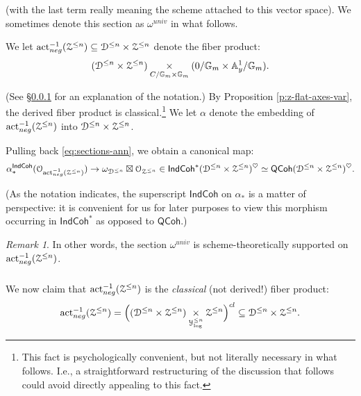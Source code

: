 \documentclass[reqno,11pt]{amsart}
\numberwithin{equation}{subsection}
\theoremstyle{remark}
\newtheorem{rem}[thm]{Remark}
\newcommand{\bA}{{\mathbb A}}
\newcommand{\bG}{{\mathbb G}}
\newcommand{\sD}{{\EuScript D}}
\newcommand{\sO}{{\EuScript O}}
\newcommand{\sY}{{\EuScript Y}}
\newcommand{\sZ}{{\EuScript Z}}
\newcommand{\on}{\operatorname}
\newcommand{\act}{\on{act}}
\newcommand{\heart}{\heartsuit}
\newcommand{\IndCoh}{\mathsf{IndCoh}}
\newcommand{\QCoh}{\mathsf{QCoh}}
\renewcommand{\subset}{\subseteq}
\begin{document}
\noindent (with the last term really meaning the
scheme attached to this vector space). We sometimes
denote this section as $\omega^{univ}$ in what
follows.

We let 
$\act_{neg}^{-1}(\sZ^{\leq n}) \subset 
\sD^{\leq n} \times \sZ^{\leq n}$ denote the fiber
product:
%
\[
(\sD^{\leq n} \times \sZ^{\leq n})
\underset{C/\bG_m\times\bG_m}{\times}
(0/\bG_m \times \bA_y^1/\bG_m).
\]

\noindent (See \S \ref{ss:act-neg-rems} for
an explanation of the notation.) 
By Proposition \ref{p:z-flat-axes-var}, the
derived fiber product is classical.\footnote{This
fact is psychologically convenient, but not literally
necessary in what follows. I.e., a straightforward
restructuring of the discussion that follows could avoid 
directly appealing to this fact.} We let
$\alpha$ denote the embedding of
$\act_{neg}^{-1}(\sZ^{\leq n})$ into 
$\sD^{\leq n} \times \sZ^{\leq n}$.

Pulling back \eqref{eq:sections-ann}, we obtain 
a canonical map:
%
\begin{equation}\label{eq:supp}
\alpha_*^{\IndCoh}
(\sO_{\act_{neg}^{-1}(\sZ^{\leq n})}) \to 
\omega_{\sD^{\leq n}} \boxtimes \sO_{\sZ^{\leq n}}
\in \IndCoh^*(\sD^{\leq n} \times \sZ^{\leq n})^{\heart}
\simeq \QCoh(\sD^{\leq n} \times \sZ^{\leq n})^{\heart}.
\end{equation}

\noindent (As the notation indicates, the
superscript $\IndCoh$ on $\alpha_*$ is a matter
of perspective: it is convenient for us for later 
purposes to view this morphism occurring in $\IndCoh^*$
as opposed to $\QCoh$.)

\begin{rem}

In other words, the section $\omega^{univ}$
is scheme-theoretically supported on 
$\act_{neg}^{-1}(\sZ^{\leq n})$.

\end{rem}

\subsubsection{}\label{ss:act-neg-rems}

We now claim that $\act_{neg}^{-1}(\sZ^{\leq n})$
is the \emph{classical} (not derived!) fiber
product:
%
\begin{equation}\label{eq:act-neg-rems}
\act_{neg}^{-1}(\sZ^{\leq n}) = 
\Big(
(\sD^{\leq n} \times \sZ^{\leq n})
\underset{\sY_{\log}^{\leq n}}{\times}
\sZ^{\leq n} 
\Big)^{cl} \subset \sD^{\leq n} \times \sZ^{\leq n}.
\end{equation}
\end{document}
